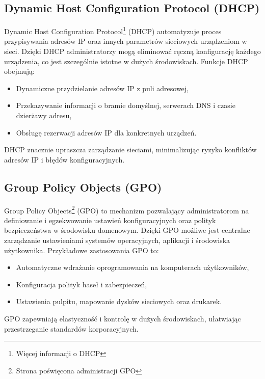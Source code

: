 \subsection{Dynamic Host Configuration Protocol (DHCP)}
Dynamic Host Configuration Protocol\footnote{Więcej informacji o DHCP\cite{dhcp}} (DHCP) automatyzuje proces przypisywania adresów IP oraz innych parametrów sieciowych urządzeniom w sieci. Dzięki DHCP administratorzy mogą eliminować ręczną konfigurację każdego urządzenia, co jest szczególnie istotne w dużych środowiskach. Funkcje DHCP obejmują:
\begin{itemize}
    \item Dynamiczne przydzielanie adresów IP z puli adresowej,
    \item Przekazywanie informacji o bramie domyślnej, serwerach DNS i czasie dzierżawy adresu,
    \item Obsługę rezerwacji adresów IP dla konkretnych urządzeń.
\end{itemize}
DHCP znacznie upraszcza zarządzanie sieciami, minimalizując ryzyko konfliktów adresów IP i błędów konfiguracyjnych.

\subsection{Group Policy Objects (GPO)}
Group Policy Objects\footnote{Strona poświęcona administracji GPO\cite{gpo}} (GPO) to mechanizm pozwalający administratorom na definiowanie i egzekwowanie ustawień konfiguracyjnych oraz polityk bezpieczeństwa w środowisku domenowym. Dzięki GPO możliwe jest centralne zarządzanie ustawieniami systemów operacyjnych, aplikacji i środowiska użytkownika. Przykładowe zastosowania GPO to:
\begin{itemize}
	\item Automatyczne wdrażanie oprogramowania na komputerach użytkowników,
    \item Konfiguracja polityk haseł i zabezpieczeń,
    \item Ustawienia pulpitu, mapowanie dysków sieciowych oraz drukarek.
\end{itemize}
GPO zapewniają elastyczność i kontrolę w dużych środowiskach, ułatwiając przestrzeganie standardów korporacyjnych.

